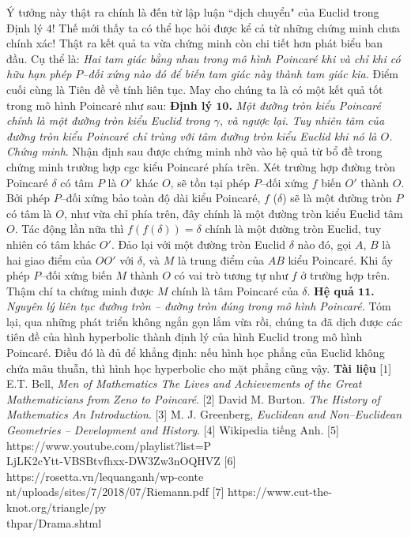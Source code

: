 \begin{multicols}{2}
	\vskip 0.1cm
	Ý tưởng này thật ra chính là đến từ lập luận ``dịch chuyển" của Euclid trong Định lý $4$! Thế mới thấy ta có thể học hỏi được kể cả từ những chứng minh chưa chính xác!
	\vskip 0.1cm
	Thật ra kết quả ta vừa chứng minh còn chi tiết hơn phát biểu ban đầu. Cụ thể là:
	\vskip 0.1cm
	\textit{Hai tam giác bằng nhau trong mô hình Poincar\'e khi và chỉ khi có hữu hạn phép $P$--đối xứng nào đó để biến tam giác này thành tam giác kia.}
	\vskip 0.1cm
	Điểm cuối cùng là Tiên đề về tính liên tục. May cho chúng ta là có một kết quả tốt trong mô hình Poincar\'e như sau:
	\vskip 0.1cm
	\textbf{\color{lichsutoanhoc}Định lý $\pmb{10}$.}  \textit{Một đường tròn kiểu Poincar\'e chính là một đường tròn kiểu Euclid trong $\gamma$, và ngược lại. Tuy nhiên tâm của đường tròn kiểu Poincar\'e chỉ trùng với tâm đường tròn kiểu Euclid khi nó là $O$.}
	\vskip 0.1cm
	\textit{Chứng minh}. Nhận định sau được chứng minh nhờ vào hệ quả từ bổ đề trong chứng minh trường hợp cgc kiểu Poincar\'e phía trên. 
	Xét trường hợp đường tròn Poincar\'e $\delta$ có tâm $P$ là $O'$ khác $O$, sẽ tồn tại phép $P$--đối xứng $f$ biến $O'$ thành $O$. Bởi phép $P$--đối xứng bảo toàn độ dài kiểu Poincar\'e, $f$ ($\delta$) sẽ là một đường tròn $P$ có tâm là $O$, như vừa chỉ phía trên, đây chính là một đường tròn kiểu Euclid tâm $O$. Tác động lần nữa thì 
	$f(f(\delta)) = \delta$ chính là một đường tròn Euclid, tuy nhiên có tâm khác $O'$.
	\vskip 0.1cm
	Đảo lại với một đường tròn Euclid $\delta$ nào đó, gọi $A$, $B$ là hai giao điểm của $OO'$ với $\delta$, và $M$ là trung điểm của $AB$ kiểu Poincar\'e. Khi ấy phép $P$--đối xứng biến $M$ thành $O$ có vai trò tương tự như $f$ ở trường hợp trên. Thậm chí ta chứng minh được $M$ chính là tâm Poincar\'e của $\delta$.
	\vskip 0.1cm
	\textbf{\color{lichsutoanhoc}Hệ quả $\pmb{11}$.}   \textit{Nguyên lý liên tục đường tròn -- đường tròn đúng trong mô hình Poincar\'e.}
	\vskip 0.1cm
	Tóm lại, qua những phát triển không ngắn gọn lắm vừa rồi, chúng ta đã dịch được các tiên đề của hình hyperbolic thành định lý của hình Euclid trong mô hình Poincar\'e. Điều đó là đủ để khẳng định: nếu hình học phẳng của Euclid không chứa mâu thuẫn, thì hình học hyperbolic cho mặt phẳng cũng vậy.
	\vskip 0.1cm
	\textbf{\color{lichsutoanhoc}Tài liệu}
	\vskip 0.1cm
	[$1$] E.T.  Bell, \textit{Men of Mathematics The Lives and Achievements of the Great Mathematicians from Zeno to Poincaré}.   
	\vskip 0.1cm
	[$2$] David M. Burton. \textit{The History of Mathematics An Introduction}. 
	\vskip 0.1cm
	[$3$] M. J. Greenberg, \textit{Euclidean and Non--Euclidean Geometries -- Development and History}. 
	\vskip 0.1cm
	[$4$] Wikipedia tiếng Anh.
	\vskip 0.1cm
	[$5$] https://www.youtube.com/playlist?list=P\\
	LjLK2cYtt-VBSBtvfhxx-DW3Zw3nOQHVZ  
	\vskip 0.1cm
	[$6$] https://rosetta.vn/lequanganh/wp-conte\\
	nt/uploads/sites/7/2018/07/Riemann.pdf 
	\vskip 0.1cm
	[$7$] https://www.cut-the-knot.org/triangle/py\\
	thpar/Drama.shtml
\end{multicols}